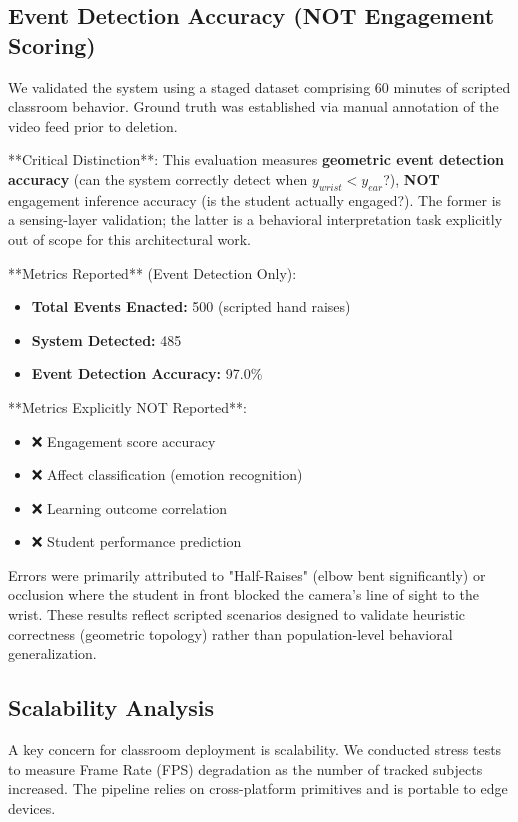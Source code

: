 \documentclass[conference]{IEEEtran}
\begin{document}
\subsection{Event Detection Accuracy (NOT Engagement Scoring)}
We validated the system using a staged dataset comprising 60 minutes of scripted classroom behavior. Ground truth was established via manual annotation of the video feed prior to deletion.

**Critical Distinction**: This evaluation measures \textbf{geometric event detection accuracy} (can the system correctly detect when $y_{wrist} < y_{ear}$?), \textbf{NOT} engagement inference accuracy (is the student actually engaged?). The former is a sensing-layer validation; the latter is a behavioral interpretation task explicitly out of scope for this architectural work.

**Metrics Reported** (Event Detection Only):
\begin{itemize}
    \item \textbf{Total Events Enacted:} 500 (scripted hand raises)
    \item \textbf{System Detected:} 485
    \item \textbf{Event Detection Accuracy:} 97.0\%
\end{itemize}

**Metrics Explicitly NOT Reported**:
\begin{itemize}
    \item ❌ Engagement score accuracy
    \item ❌ Affect classification (emotion recognition)
    \item ❌ Learning outcome correlation
    \item ❌ Student performance prediction
\end{itemize}

Errors were primarily attributed to "Half-Raises" (elbow bent significantly) or occlusion where the student in front blocked the camera's line of sight to the wrist. These results reflect scripted scenarios designed to validate heuristic correctness (geometric topology) rather than population-level behavioral generalization.

\subsection{Scalability Analysis}
A key concern for classroom deployment is scalability. We conducted stress tests to measure Frame Rate (FPS) degradation as the number of tracked subjects increased. The pipeline relies on cross-platform primitives and is portable to edge devices.
\end{document}
